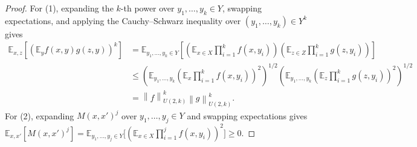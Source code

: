 \documentclass[11pt]{article}
\theoremstyle{definition}
\newcommand{\E}{\mathbb{E}}
\newcommand{\norm}[1]{\left\lVert #1 \right\rVert}
\begin{document}
\begin{proof}
For (1), expanding the $k$-th power over $y_1, \dots, y_k \in Y$, swapping expectations, and applying the Cauchy--Schwarz inequality over $(y_1, \dots, y_k) \in Y^k$ gives
\begin{align*}
    \E_{x, z}\!\left[\left(\E_y f(x, y) g(z, y)\right)^k\right]
    &= \E_{y_1, \dots, y_k \in Y}\!\left[\left(\E_{x \in X}\prod_{i=1}^k f(x, y_i)\right)\left(\E_{z \in Z}\prod_{i=1}^k g(z, y_i)\right)\right] \\
    &\le \left(\E_{y_1, \dots, y_k}\!\left(\E_x \prod_{i=1}^k f(x, y_i)\right)^2\right)^{1/2} \left(\E_{y_1, \dots, y_k}\!\left(\E_z \prod_{i=1}^k g(z, y_i)\right)^2\right)^{1/2} \\
    &= \norm{f}_{U(2, k)}^k \norm{g}_{U(2, k)}^k.
\end{align*}
For (2), expanding $M(x, x')^j$ over $y_1, \dots, y_j \in Y$ and swapping expectations gives $\E_{x, x'}[M(x, x')^j] = \E_{y_1, \dots, y_j \in Y}\big[(\E_{x \in X}\prod_{i=1}^j f(x, y_i))^2\big] \ge 0$.
\end{proof}
\end{document}
